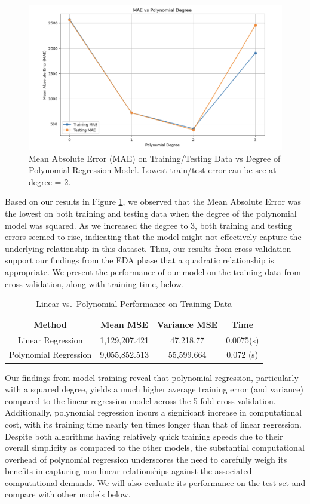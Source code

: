 \documentclass[conference]{IEEEtran}
\begin{document}
\begin{figure}[H]
    \centering
    \includegraphics[width=0.8\linewidth]{mae_poly.png} %
    \caption{Mean Absolute Error (MAE) on Training/Testing Data vs Degree of Polynomial Regression Model. Lowest train/test error can be see at degree = 2.}
    \label{fig:degree}
\end{figure}

Based on our results in Figure \ref{fig:degree}, we observed that the Mean Absolute Error was the lowest on both training and testing data when the degree of the polynomial model was squared. As we increased the degree to 3, both training and testing errors seemed to rise, indicating that the model might not effectively capture the underlying relationship in this dataset. Thus, our results from cross validation support our findings from the EDA phase that a quadratic relationship is appropriate. We present the performance of our model on the training data from cross-validation, along with training time, below.

\begin{table}[h]
\centering
\caption{Linear vs.\ Polynomial Performance on Training Data}
\begin{tabular}{|c|c|c|c|}
\hline
Method & Mean MSE & Variance MSE & Time \\
\hline
Linear Regression & 1,129,207.421 & 47,218.77 & 0.0075(s) \\
\hline
Polynomial Regression &  9,055,852.513 & 55,599.664 & 0.072 (s) \\
\hline
\end{tabular}
\label{tab:lr_trn}
\end{table}

Our findings from model training reveal that polynomial regression, particularly with a squared degree, yields a much higher average training error (and variance) compared to the linear regression model across the 5-fold cross-validation. Additionally, polynomial regression incurs a significant increase in computational cost, with its training time nearly ten times longer than that of linear regression. Despite both algorithms having relatively quick training speeds due to their overall simplicity as compared to the other models, the substantial computational overhead of polynomial regression underscores the need to carefully weigh its benefits in capturing non-linear relationships against the associated computational demands. We will also evaluate its performance on the test set and compare with other models below. 
\end{document}
